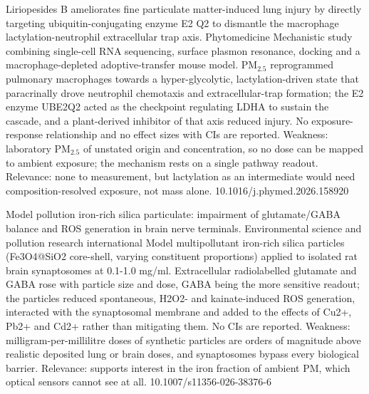 \documentclass[10pt]{article}
\begin{document}
{Liriopesides B ameliorates fine particulate matter-induced lung injury by directly targeting ubiquitin-conjugating enzyme E2 Q2 to dismantle the macrophage lactylation-neutrophil extracellular trap axis.}
{Phytomedicine}
{Mechanistic study combining single-cell RNA sequencing, surface plasmon resonance, docking and a macrophage-depleted adoptive-transfer mouse model. PM$_{2.5}$ reprogrammed pulmonary macrophages towards a hyper-glycolytic, lactylation-driven state that paracrinally drove neutrophil chemotaxis and extracellular-trap formation; the E2 enzyme UBE2Q2 acted as the checkpoint regulating LDHA to sustain the cascade, and a plant-derived inhibitor of that axis reduced injury. No exposure-response relationship and no effect sizes with CIs are reported. Weakness: laboratory PM$_{2.5}$ of unstated origin and concentration, so no dose can be mapped to ambient exposure; the mechanism rests on a single pathway readout. Relevance: none to measurement, but lactylation as an intermediate would need composition-resolved exposure, not mass alone.}
{10.1016/j.phymed.2026.158920}

{Model pollution iron-rich silica particulate: impairment of glutamate/GABA balance and ROS generation in brain nerve terminals.}
{Environmental science and pollution research international}
{Model multipollutant iron-rich silica particles (Fe3O4@SiO2 core-shell, varying constituent proportions) applied to isolated rat brain synaptosomes at 0.1-1.0 mg/ml. Extracellular radiolabelled glutamate and GABA rose with particle size and dose, GABA being the more sensitive readout; the particles reduced spontaneous, H2O2- and kainate-induced ROS generation, interacted with the synaptosomal membrane and added to the effects of Cu2+, Pb2+ and Cd2+ rather than mitigating them. No CIs are reported. Weakness: milligram-per-millilitre doses of synthetic particles are orders of magnitude above realistic deposited lung or brain doses, and synaptosomes bypass every biological barrier. Relevance: supports interest in the iron fraction of ambient PM, which optical sensors cannot see at all.}
{10.1007/s11356-026-38376-6}
\end{document}
